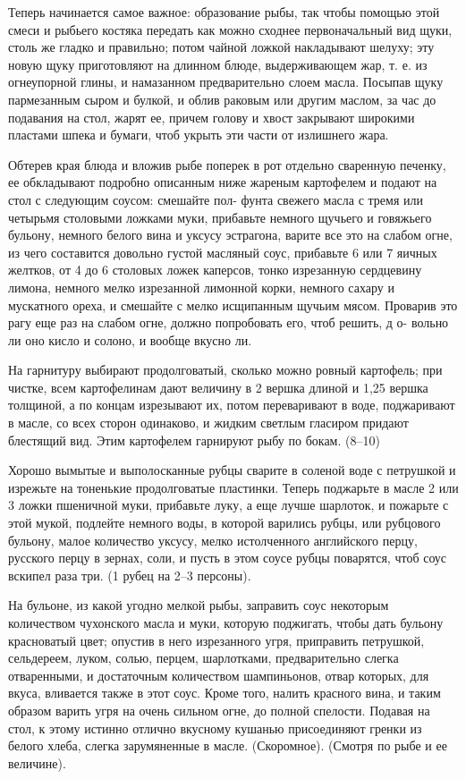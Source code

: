 Теперь начинается самое важное: образование рыбы, так чтобы помощью этой смеси и рыбьего костяка передать как можно сходнее первоначальный вид щуки, столь же гладко и правильно; потом чайной ложкой накладывают шелуху; эту новую щуку приготовляют на длинном блюде, выдерживающем жар, т. е. из огнеупорной глины, и намазанном предварительно слоем масла. Посыпав щуку пармезанным сыром и булкой, и облив раковым или другим маслом, за час до подавания на стол, жарят ее, причем голову и хвост закрывают широкими пластами шпека и бумаги, чтоб укрыть эти части от излишнего жара. 

Обтерев края блюда и вложив рыбе поперек в рот отдельно сваренную печенку, ее обкладывают подробно описанным ниже жареным картофелем и подают на стол с следующим соусом: смешайте пол- фунта свежего масла с тремя или четырьмя столовыми ложками муки, прибавьте немного щучьего и говяжьего бульону, немного белого вина и уксусу эстрагона, варите все это на слабом огне, из чего составится довольно густой масляный соус, прибавьте 6 или 7 яичных желтков, от 4 до 6 столовых ложек каперсов, тонко изрезанную сердцевину лимона, немного мелко изрезанной лимонной корки, немного сахару и мускатного ореха, и смешайте с мелко исщипанным щучьим мясом. Проварив это рагу еще раз на слабом огне, должно попробовать его, чтоб решить, д о- вольно ли оно кисло и солоно, и вообще вкусно ли. 

На гарнитуру выбирают продолговатый, сколько можно ровный картофель; при чистке, всем картофелинам дают величину в 2 вершка длиной и 1,25 вершка толщиной, а по концам изрезывают их, потом переваривают в воде, поджаривают в масле, со всех сторон одинаково, и жидким светлым гласиром придают блестящий вид. Этим картофелем гарнируют рыбу по бокам. (8--10) 


Хорошо вымытые и выполосканные рубцы сварите в соленой воде с петрушкой и изрежьте на тоненькие продолговатые пластинки. Теперь поджарьте в масле 2 или 3 ложки пшеничной муки, прибавьте луку, а еще лучше шарлоток, и пожарьте с этой мукой, подлейте немного воды, в которой варились рубцы, или рубцового бульону, малое количество уксусу, мелко истолченного английского перцу, русского перцу в зернах, соли, и пусть в этом соусе рубцы поварятся, чтоб соус вскипел раза три. (1 рубец на 2--3 персоны). 


На бульоне, из какой угодно мелкой рыбы, заправить соус некоторым количеством чухонского масла и муки, которую поджигать, чтобы дать бульону красноватый цвет; опустив в него изрезанного угря, приправить петрушкой, сельдереем, луком, солью, перцем, шарлотками, предварительно слегка отваренными, и достаточным количеством шампиньонов, отвар которых, для вкуса, вливается также в этот соус. Кроме того, налить красного вина, и таким образом варить угря на очень сильном огне, до полной спелости. Подавая на стол, к этому истинно отлично вкусному кушанью присоединяют гренки из белого хлеба, слегка зарумяненные в масле. (Скоромное). (Смотря по рыбе и ее величине). 


